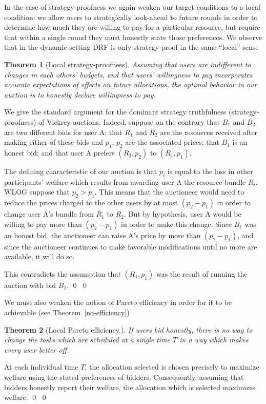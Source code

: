 \documentclass{acm_proc_article-sp}
\newtheorem{theorem}{Theorem}[section]
\newenvironment{pproof}[1][Proof]{\begin{trivlist}
\item[\hskip \labelsep {\bfseries #1}]}{\end{trivlist}}
\begin{document}
\vspace{-8mm}
In the case of strategy-proofness we again weaken our target conditions
to a local condition: we allow users to strategically look-ahead to future
rounds in order to determine how much they are willing to pay for a particular resource,
but require that within a single round they must honestly state those preferences.
We observe that in the dynamic setting DRF is only strategy-proof in the same ``local'' sense
\begin{theorem}[Local strategy-proofness] 
Assuming that users are indifferent to changes in each others' budgets,
and that users' willingness to pay 
incorporates accurate expectations of effects on future allocations, 
the optimal behavior in our auction is to honestly declare willingness to pay.
\end{theorem}
\vspace{-7mm}
\begin{pproof}
We give the standard argument for the dominant strategy truthfulness (strategy-proofness) of Vickrey auctions. 
Indeed, suppose on the contrary 
that $B_1$ and $B_2$ are two different bids for user A; that $R_1$ and $R_2$ are the resources received after making either of these bids and $p_1$, $p_2$ are the associated prices; that $B_1$ is an honest bid; and that user A prefers $(R_2, p_2)$ to $(R_1, p_1)$.

The defining characteristic of our auction is that $p_i$ is equal to the loss in other participants' welfare which results from awarding user A the resource bundle $R_i$. 
WLOG suppose that $p_2> p_1$.
This means that the auctioneer would need to reduce the prices charged to the other users by at most $(p_2 - p_1)$ in order to change user A's bundle from $R_1$ to $R_2$. 
But by hypothesis, user A would be willing to pay more than $(p_2 - p_1)$ in order to make this change. 
Since $B_1$ was an honest bid, the auctioneer can raise A's price by more than $(p_2 - p_1)$, 
and since the auctioneer continues to make favorable modifications until no more are available, it will do so.

This contradicts the assumption that $(R_1, p_1)$ was the result of running the auction with bid $B_1$. \qed 
\qed
\end{pproof}
\vspace{-5mm}
We must also weaken the notion of Pareto efficiency in order for it to be achievable (see Theorem~\ref{no-efficiency})
\vspace{-5mm}
\begin{theorem}[Local Pareto efficiency.]
If users bid honestly, 
there is no way to change the tasks which are scheduled at a single time $T$ in a way which makes every user better off.
\end{theorem}
\vspace{-5mm}
\begin{pproof}
At each individual time $T$, the allocation selected is chosen precisely to maximize welfare using the stated preferences of bidders. 
Consequently, assuming that bidders honestly report their welfare, the allocation which is selected maximizes welfare. \qed
\qed
\end{pproof}
\end{document}
